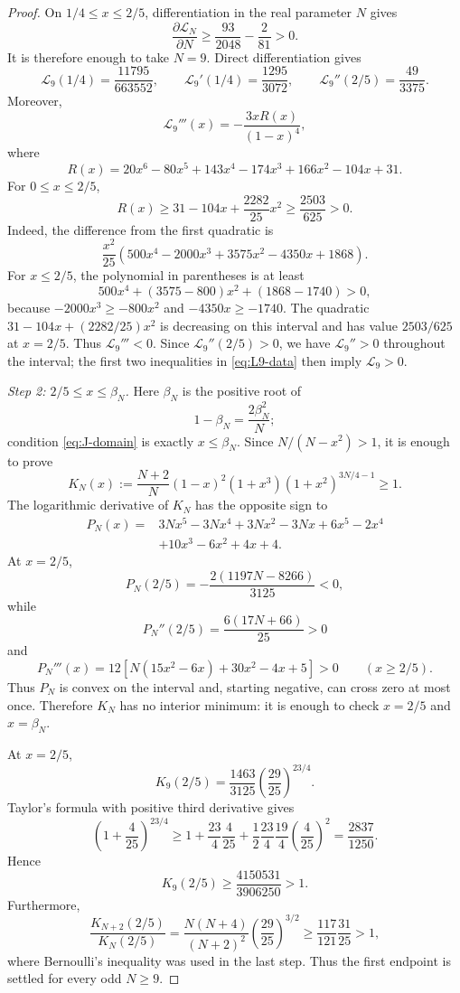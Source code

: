\documentclass[11pt]{article}
\begin{document}
\begin{proof}
On \(1/4\le x\le2/5\), differentiation in the real parameter \(N\) gives
\[
 \frac{\partial\mathcal L_N}{\partial N}
 \ge\frac{93}{2048}-\frac2{81}>0.
\]
It is therefore enough to take \(N=9\).  Direct differentiation gives
\begin{equation}\label{eq:L9-data}
 \mathcal L_9(1/4)=\frac{11795}{663552},
 \qquad
 \mathcal L_9'(1/4)=\frac{1295}{3072},
 \qquad
 \mathcal L_9''(2/5)=\frac{49}{3375}.
\end{equation}
Moreover,
\[
 \mathcal L_9'''(x)=-\frac{3xR(x)}{(1-x)^4},
\]
where
\[
 R(x)=20x^6-80x^5+143x^4-174x^3+166x^2-104x+31.
\]
For \(0\le x\le2/5\),
\[
 R(x)\ge31-104x+\frac{2282}{25}x^2
 \ge\frac{2503}{625}>0.
\]
Indeed, the difference from the first quadratic is
\[
 \frac{x^2}{25}
 (500x^4-2000x^3+3575x^2-4350x+1868).
\]
For \(x\le2/5\), the polynomial in parentheses is at least
\[
 500x^4+(3575-800)x^2+(1868-1740)>0,
\]
because \(-2000x^3\ge-800x^2\) and \(-4350x\ge-1740\).
The quadratic \(31-104x+(2282/25)x^2\) is decreasing on this interval and
has value \(2503/625\) at \(x=2/5\).  Thus
\(\mathcal L_9'''<0\).  Since \(\mathcal L_9''(2/5)>0\), we have
\(\mathcal L_9''>0\) throughout the interval; the first two inequalities in
\eqref{eq:L9-data} then imply \(\mathcal L_9>0\).

\smallskip
\noindent\emph{Step 2: \(2/5\le x\le\beta_N\).}
Here \(\beta_N\) is the positive root of
\[
       1-\beta_N=\frac{2\beta_N^2}{N};
\]
condition \eqref{eq:J-domain} is exactly \(x\le\beta_N\).  Since
\(N/(N-x^2)>1\), it is enough to prove
\begin{equation}\label{eq:K-N-def}
 K_N(x):=
 \frac{N+2}{N}(1-x)^2(1+x^3)(1+x^2)^{3N/4-1}\ge1.
\end{equation}
The logarithmic derivative of \(K_N\) has the opposite sign to
\begin{align}
 P_N(x)={}&3Nx^5-3Nx^4+3Nx^2-3Nx
          +6x^5-2x^4\\
         &+10x^3-6x^2+4x+4.
 \label{eq:P-N}
\end{align}
At \(x=2/5\),
\[
       P_N(2/5)=-\frac{2(1197N-8266)}{3125}<0,
\]
while
\[
       P_N''(2/5)=\frac{6(17N+66)}{25}>0
\]
and
\[
 P_N'''(x)=12\left[N(15x^2-6x)+30x^2-4x+5\right]>0
 \qquad(x\ge2/5).
\]
Thus \(P_N\) is convex on the interval and, starting negative, can cross
zero at most once.  Therefore \(K_N\) has no interior minimum: it is enough
to check \(x=2/5\) and \(x=\beta_N\).

At \(x=2/5\),
\[
       K_9(2/5)=\frac{1463}{3125}
       \left(\frac{29}{25}\right)^{23/4}.
\]
Taylor's formula with positive third derivative gives
\[
 \left(1+\frac4{25}\right)^{23/4}
 \ge1+\frac{23}{4}\frac4{25}
 +\frac12\frac{23}{4}\frac{19}{4}
       \left(\frac4{25}\right)^2
 =\frac{2837}{1250}.
\]
Hence
\[
       K_9(2/5)\ge\frac{4150531}{3906250}>1.
\]
Furthermore,
\[
 \frac{K_{N+2}(2/5)}{K_N(2/5)}
 =\frac{N(N+4)}{(N+2)^2}
  \left(\frac{29}{25}\right)^{3/2}
 \ge\frac{117}{121}\frac{31}{25}>1,
\]
where Bernoulli's inequality was used in the last step.  Thus the first
endpoint is settled for every odd \(N\ge9\).


\end{proof}
\end{document}
